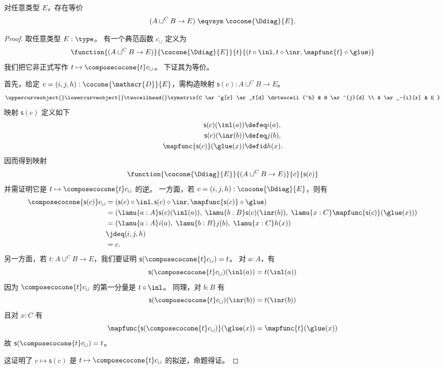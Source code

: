 \begin{lem}\label{thm:pushout-ump}
  对任意类型 $E$，存在等价
  \[ (A\sqcup^C B \to E) \;\eqvsym\; \cocone{\Ddiag}{E}. \]
\end{lem}
\begin{proof}
  取任意类型 $E:\type$。
  有一个典范函数 $c_\sqcup$ 定义为
  \[\function{(A\sqcup^CB\to{}E)}{\cocone{\Ddiag}{E}}
  {t}{(t\circ{}\inl,t\circ{}\inr,\mapfunc{t}\circ{}\glue)}\]
  我们把它非正式写作 $t\mapsto\composecocone{t}c_\sqcup$。
  下证其为等价。

  首先，给定 $c=(i,j,h):\cocone{\mathscr{D}}{E}$，需构造映射
  $\mathsf{s}(c):A\sqcup^CB\to E$。
  \[\uppercurveobject{{ }}\lowercurveobject{{ }}\twocellhead{{ }}
  \xymatrix{C \ar^g[r] \ar_f[d] \drtwocell{^h} & B \ar^{j}[d] \\
    A \ar_-{i}[r] & E }\]
  映射 $\mathsf{s}(c)$ 定义如下
  \begin{align*}
    \mathsf{s}(c)(\inl(a))&\defeq i(a),\\
    \mathsf{s}(c)(\inr(b))&\defeq j(b),\\
    \mapfunc{\mathsf{s}(c)}(\glue(x))&\defid h(x).
  \end{align*}
  因而得到映射
\[\function{\cocone{\Ddiag}{E}}{(A\sqcup^CB\to{}E)}{c}{\mathsf{s}(c)}\]
并需证明它是 $t\mapsto{}\composecocone{t}c_\sqcup$ 的逆。
一方面，若 $c=(i,j,h):\cocone{\Ddiag}{E}$，则有
\begin{align*}
  \composecocone{\mathsf{s}(c)}c_\sqcup & =
  (\mathsf{s}(c)\circ\inl,\mathsf{s}(c)\circ\inr,
  \mapfunc{\mathsf{s}(c)}\circ\glue) \\
  & = (\lamu{a:A} \mathsf{s}(c)(\inl(a)),\;
  \lamu{b:B} \mathsf{s}(c)(\inr(b)),\;
  \lamu{x:C} \mapfunc{\mathsf{s}(c)}(\glue(x))) \\
  & = (\lamu{a:A} i(a),\;
  \lamu{b:B} j(b),\;
  \lamu{x:C} h(x)) \\
  & \jdeq (i, j, h) \\
  & = c.
\end{align*}
%
另一方面，若 $t:A\sqcup^CB\to{}E$，我们要证明
$\mathsf{s}(\composecocone{t}c_\sqcup)=t$。
对 $a:A$，有
\[\mathsf{s}(\composecocone{t}c_\sqcup)(\inl(a))=t(\inl(a))\]
因为 $\composecocone{t}c_\sqcup$ 的第一分量是 $t\circ\inl$。
同理，对 $b:B$ 有
\[\mathsf{s}(\composecocone{t}c_\sqcup)(\inr(b))=t(\inr(b))\]
且对 $x:C$ 有
\[\mapfunc{\mathsf{s}(\composecocone{t}c_\sqcup)}(\glue(x))
=\mapfunc{t}(\glue(x))\]
故 $\mathsf{s}(\composecocone{t}c_\sqcup)=t$。

这证明了 $c\mapsto\mathsf{s}(c)$ 是 $t\mapsto{}\composecocone{t}c_\sqcup$ 的拟逆，命题得证。
\end{proof}

